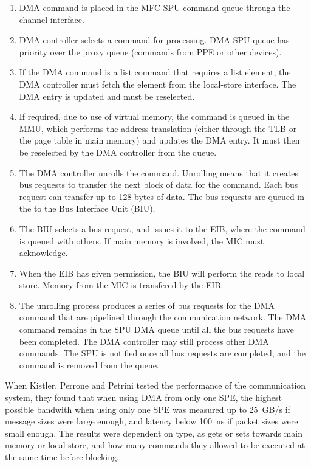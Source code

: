 \begin{enumerate}
    \item DMA command is placed in the MFC SPU command queue through the channel interface.
    \item DMA controller selects a command for processing. DMA SPU queue has priority over the proxy queue (commands from PPE or other devices).
    \item If the DMA command is a list command that requires a list element, the DMA controller must fetch the element from the local-store interface. 
    The DMA entry is updated and must be reselected.
    \item If required, due to use of virtual memory, the command is queued in the MMU, which performs the address translation (either through the TLB or the page table in main memory) and updates the DMA entry. 
    It must then be reselected by the DMA controller from the queue.
    \item The DMA controller unrolls the command.
    Unrolling means that it creates bus requests to transfer the next block of data for the command.
    Each bus request can transfer up to 128 bytes of data.
    The bus requests are queued in the to the Bus Interface Unit (BIU).
    \item The BIU selects a bus request, and issues it to the EIB, where the command is queued with others.
    If main memory is involved, the MIC must acknowledge.
    \item When the EIB has given permission, the BIU will perform the reads to local store. %
    Memory from the MIC is transfered by the EIB.
    \item The unrolling process produces a series of bus requests for the DMA command that are pipelined through the communication network.
    The DMA command remains in the SPU DMA queue until all the bus requests have been completed.
    The DMA controller may still process other DMA commands.
    The SPU is notified once all bus requests are completed, and the command is removed from the queue. 
\end{enumerate}

When Kistler, Perrone and Petrini tested the performance of the communication system, they found that when using DMA from only one SPE, the highest possible bandwith when using only one SPE was measured up to 25~GB/s if message sizes were large enough, and latency below 100~ns if packet sizes were small enough.
The results were dependent on type, as gets or sets towards main memory or local store, and how many commands they allowed to be executed at the same time before blocking.

